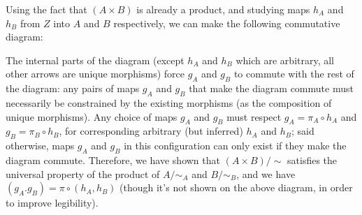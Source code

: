 \documentclass[12pt, letterpaper, twoside]{report}
\begin{document}
Using the fact that $(A \times B)$ is already a product, and studying maps $h_A$ and $h_B$ from $Z$ into $A$ and $B$ respectively, we can make the following commutative diagram:


The internal parts of the diagram (except $h_A$ and $h_B$ which are arbitrary, all other arrows are unique morphisms) force $g_A$ and $g_B$ to commute with the rest of the diagram: any pairs of maps $g_A$ and $g_B$ that make the diagram commute must necessarily be constrained by the existing morphisms (as the composition of unique morphisms). Any choice of maps $g_A$ and $g_B$ must respect $g_A = \pi_A \circ h_A$ and $g_B = \pi_B \circ h_B$, for corresponding arbitrary (but inferred) $h_A$ and $h_B$; said otherwise, maps $g_A$ and $g_B$ in this configuration can only exist if they make the diagram commute. Therefore, we have shown that $(A \times B)/\sim$ satisfies the universal property of the product of $A/\sim_A$ and $B/\sim_B$, and we have $(g_A. g_B) = \pi \circ (h_A, h_B)$ (though it's not shown on the above diagram, in order to improve legibility).
\end{document}
